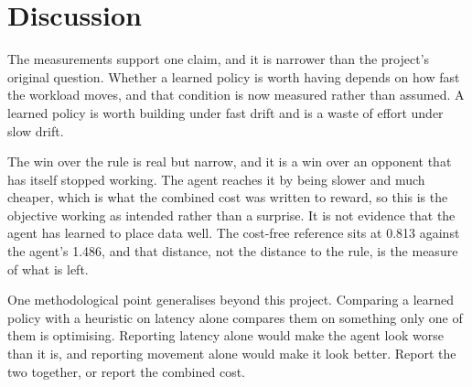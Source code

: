 \section{Discussion}

The measurements support one claim, and it is narrower than the project's
original question. Whether a learned policy is worth having depends on how
fast the workload moves, and that condition is now measured rather than
assumed. A learned policy is worth building under fast drift and is a waste of
effort under slow drift.

The win over the rule is real but narrow, and it is a win over an opponent
that has itself stopped working. The agent reaches it by being slower and much
cheaper, which is what the combined cost was written to reward, so this is the
objective working as intended rather than a surprise. It is not evidence that
the agent has learned to place data well. The cost-free reference sits at
0.813 against the agent's 1.486, and that distance, not the distance to the
rule, is the measure of what is left.

One methodological point generalises beyond this project. Comparing a learned
policy with a heuristic on latency alone compares them on something only one
of them is optimising. Reporting latency alone would make the agent look worse
than it is, and reporting movement alone would make it look better. Report the
two together, or report the combined cost.

